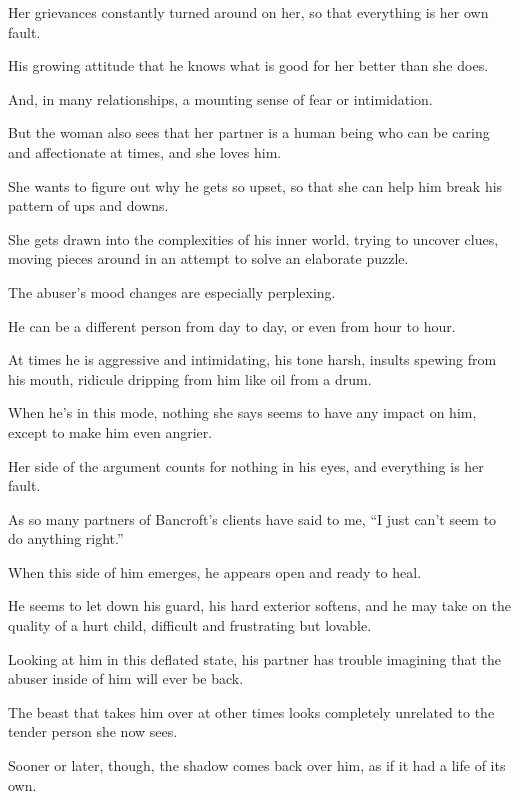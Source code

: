 \documentclass[oneside]{article}
\numberwithin{equation}{section}
\begin{document}
Her grievances constantly turned around on her, so that everything is her own fault.

His growing attitude that he knows what is good for her better than she does.

And, in many relationships, a mounting sense of fear or intimidation.

But the woman also sees that her partner is a human being who can be caring and affectionate at times, and she loves him.

She wants to figure out why he gets so upset, so that she can help him break his pattern of ups and downs.

She gets drawn into the complexities of his inner world, trying to uncover clues, moving pieces around in an attempt to solve an elaborate puzzle.

%
The abuser's mood changes are especially perplexing.

He can be a different person from day to day, or even from hour to hour.

At times he is aggressive and intimidating, his tone harsh, insults spewing from his mouth, ridicule dripping from him like oil from a drum.

When he's in this mode, nothing she says seems to have any impact on him, except to make him even angrier.

Her side of the argument counts for nothing in his eyes, and everything is her fault.


As so many partners of Bancroft's clients have said to me, ``I just can't seem to do anything right.''

%

When this side of him emerges, he appears open and ready to heal.

He seems to let down his guard, his hard exterior softens, and he may take on the quality of a hurt child, difficult and frustrating but lovable.

Looking at him in this deflated state, his partner has trouble imagining that the abuser inside of him will ever be back.

The beast that takes him over at other times looks completely unrelated to the tender person she now sees.

%
Sooner or later, though, the shadow comes back over him, as if it had a life of its own.
\end{document}
